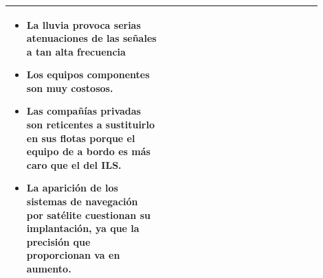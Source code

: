 \begin{landscape}
\begin{table}[!htb]
\begin{tabular}{m{0.45\linewidth}m{0.45\linewidth}}
\begin{itemize}
\item La lluvia provoca serias atenuaciones de las
señales a tan alta frecuencia

\item  Los equipos componentes son muy costosos.

\item Las compañías privadas son reticentes a sustituirlo en sus flotas porque el equipo de a bordo
es más caro que el del ILS.

\item La aparición de los sistemas de navegación por
satélite cuestionan su implantación, ya que la
precisión que proporcionan va en aumento.

\end{itemize}
   \\ \hline
    \end{tabular}
  \end{table}
\end{landscape}


















